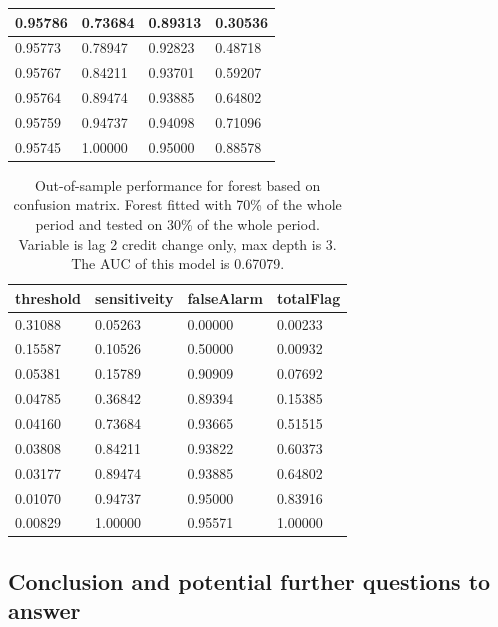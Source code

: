 \documentclass{article}
\begin{document}
\begin{multicols}{2}
\begin{table}[H]
\begin{tabular}{|l|l|l|l|}
        0.95786 & 0.73684  & 0.89313 & 0.30536  \\ \hline
        0.95773 & 0.78947  & 0.92823 & 0.48718  \\ \hline
        0.95767 & 0.84211  & 0.93701  & 0.59207   \\ \hline
        0.95764   & 0.89474  & 0.93885 & 0.64802   \\ \hline
        0.95759 & 0.94737  & 0.94098  & 0.71096    \\ \hline
        0.95745 & 1.00000                 & 0.95000               & 0.88578   \\ \hline
        \end{tabular}
\end{table}

\begin{table}[H]
        \caption{Out-of-sample performance for forest based on confusion matrix. Forest fitted with 70\% of the whole period and tested on
        30\% of the whole period. Variable is lag 2 credit change only,
        max depth is 3. The AUC of this model is 0.67079.}

    \begin{tabular}{|l|l|l|l|}
    \hline
     threshold           & sensitiveity        & falseAlarm         & totalFlag            \\ \hline
    0.31088  & 0.05263 & 0.00000                & 0.00233 \\ \hline
    0.15587  & 0.10526 & 0.50000                & 0.00932 \\ \hline
    0.05381   & 0.15789 & 0.90909 & 0.07692  \\ \hline
    0.04785 & 0.36842  & 0.89394 & 0.15385  \\ \hline
    0.04160  & 0.73684  & 0.93665 & 0.51515   \\ \hline
    0.03808  & 0.84211  & 0.93822 & 0.60373   \\ \hline
    0.03177  & 0.89474  & 0.93885 & 0.64802   \\ \hline
    0.01070 & 0.94737  & 0.95000               & 0.83916   \\ \hline
    0.00829  & 1.00000                 & 0.95571 & 1.00000                  \\ \hline
    \end{tabular}
\end{table}
\end{multicols}

\subsection*{Conclusion and potential further questions to answer}
\end{document}

